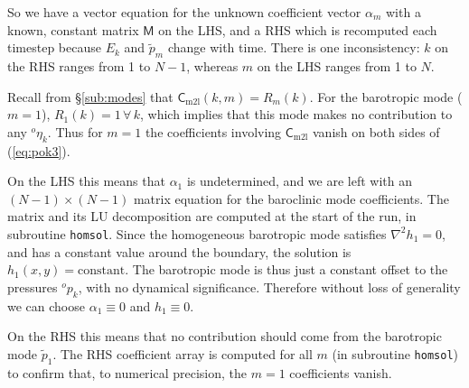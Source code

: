 \documentclass[11pt, a4paper,twoside]{article}
\newcommand{\etb}[2]{{{}^{#1}\eta_{#2}}}
\newcommand{\p}[2]{{{}^{#1}p_{#2}}}
\newcommand{\vc}[1]{\mathbf{#1}}
\newcommand{\mtx}[1]{\vc{\mathsf{#1}}}
\newcommand{\cml}[0]{\mtx{C}_{\mathrm{m2l}}}
\numberwithin{equation}{section}
\begin{document}
So we have a vector equation for the unknown coefficient vector $\alpha_m$ with a known, constant matrix $\mathsf M$ on the LHS, and a RHS which is recomputed each timestep because $E_k$ and $\tilde{p}_m$ change with time.
There is one inconsistency: $k$ on the RHS ranges from 1 to $N-1$, whereas $m$ on the LHS ranges from 1 to $N$.

Recall from \S\ref{sub:modes} that $\cml(k,m) = R_m(k)$. 
For the barotropic mode ($m=1$), $R_1(k)=1 \, \forall \, k$, which implies that this mode makes no contribution to any $\etb{o}{k}$.
Thus for $m=1$ the coefficients involving $\cml$ vanish on both sides of (\ref{eq:pok3}).

On the LHS this means that $\alpha_1$ is undetermined, and we are left with an $(N-1) \times (N-1)$ matrix equation for the baroclinic mode coefficients.
The matrix and its LU decomposition are computed at the start of the run, in subroutine \verb=homsol=.
Since the homogeneous barotropic mode satisfies $\nabla^2 h_1 = 0$, and has a constant value around the boundary, the solution is $h_1(x,y) =  \textrm{constant}$.
The barotropic mode is thus just a constant offset to the pressures $\p{o}{k}$, with no dynamical significance.
Therefore without loss of generality we can choose $\alpha_1 \equiv 0$ and $h_1 \equiv 0$.

On the RHS this means that no contribution should come from the barotropic mode $\tilde{p}_1$.
The RHS coefficient array is computed for all $m$ (in subroutine \verb=homsol=) to confirm that, to numerical precision, the $m=1$ coefficients vanish.
\end{document}
